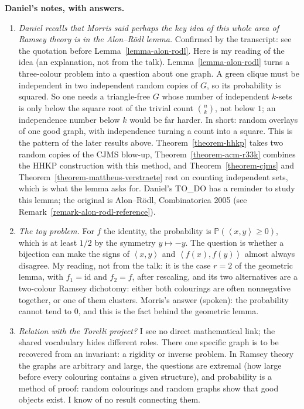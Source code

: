 \medskip\noindent
{\bf Daniel's notes, with answers.}
\begin{enumerate}
\item \emph{Daniel recalls that Morris said
perhaps the key idea of this whole area of
Ramsey theory is in the Alon--R\"odl
lemma.} Confirmed by the transcript: see
the quotation before
Lemma~\ref{lemma-alon-rodl}. Here is my
reading
of the idea (an explanation, not from the
talk). Lemma~\ref{lemma-alon-rodl} turns a
three-colour problem into a question about
one graph. A green clique must be
independent in two independent random copies
of $G$, so its probability is squared. So
one needs a triangle-free $G$ whose number
of independent $k$-sets is only below the
square root of the trivial count
$\binom{n}{k}$, not below $1$; an
independence number below $k$ would be far
harder. In short: random overlays of one
good graph, with independence turning a
count into a square. This is the pattern of
the later results above.
Theorem~\ref{theorem-hhkp} takes two random
copies of the CJMS blow-up,
Theorem~\ref{theorem-acm-r33k} combines the
HHKP construction with this method, and
Theorem~\ref{theorem-cjms} and
Theorem~\ref{theorem-mattheus-verstraete}
rest on counting independent sets, which is
what the lemma asks for. Daniel's TO\_DO has
a reminder to study this lemma; the original
is Alon--R\"odl, Combinatorica 2005 (see
Remark~\ref{remark-alon-rodl-reference}).
\item \emph{The toy problem.} For $f$ the
identity, the probability is
$\mathbb{P}(\left\langle{} x,y
\right\rangle{} \ge 0)$,
which is at least $1/2$ by the symmetry
$y \mapsto -y$. The question is whether a
bijection can make the signs of
$\left\langle{} x,y \right\rangle{}$ and
$\left\langle{} f(x),f(y) \right\rangle{}$
almost always disagree. My reading, not from
the talk: it
is the case $r = 2$ of the geometric lemma,
with $f_1 = \mathrm{id}$ and $f_2 = f$, after
rescaling, and its two alternatives are a
two-colour Ramsey dichotomy: either both
colourings are often nonnegative together,
or one of them clusters. Morris's answer
(spoken): the probability cannot tend to
$0$, and this is the fact behind the
geometric lemma.
\item \emph{Relation with the Torelli
project?} I see no direct mathematical
link; the shared vocabulary hides different
roles. There one specific graph is to be
recovered from an invariant: a rigidity or
inverse problem. In Ramsey theory the graphs
are arbitrary and large, the questions are
extremal (how large before every colouring
contains a given structure), and probability
is a method of proof: random colourings and
random graphs show that good objects exist.
I know of no result connecting them.
\end{enumerate}



